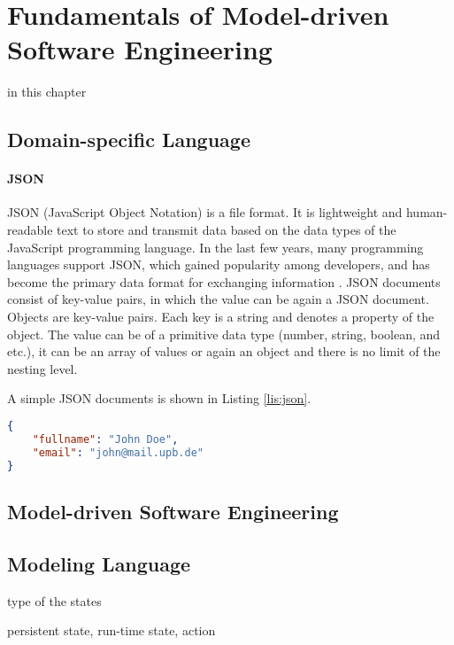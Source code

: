 \chapter{Fundamentals of Model-driven Software Engineering}
\label{ch:fundamentals}

in this chapter

\section{Domain-specific Language}
\subsubsection{JSON}
JSON (JavaScript Object Notation) is a file format. It is lightweight and human-readable text to store and transmit data based on the data types of the JavaScript programming language. In the last few years, many programming languages support JSON, which gained popularity among developers, and has become the primary data format for exchanging information \cite{json-schema}. JSON documents consist of key-value pairs, in which the value can be again a JSON document. Objects are key-value pairs. Each key is a string and denotes a property of the object. The value can be of a primitive data type (number, string, boolean, and etc.), it can be an array of values or again an object and there is no limit of the nesting level. 

A simple JSON documents is shown in Listing \ref{lis:json}.

\lstset{
  label=lis:json, caption=A simple JSON document., 
}
\begin{lstlisting}[language=json]
{
    "fullname": "John Doe",
    "email": "john@mail.upb.de"
}
\end{lstlisting}
\section{Model-driven Software Engineering}
\section{Modeling Language}

type of the states

persistent state, run-time state, action